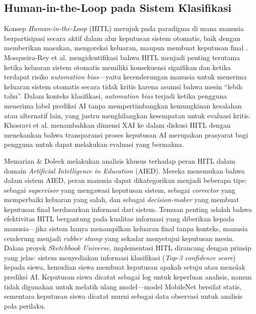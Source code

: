 \documentclass[12pt,a4paper,oneside,openany]{report}
\begin{document}
\subsection{Human-in-the-Loop pada Sistem Klasifikasi}
\label{subsec:hitl-klasifikasi}

Konsep \textit{Human-in-the-Loop} (HITL) merujuk pada paradigma di mana manusia berpartisipasi secara aktif dalam alur keputusan sistem otomatis, baik dengan memberikan masukan, mengoreksi keluaran, maupun membuat keputusan final \cite{ref4}. Mosqueira-Rey et al. \cite{ref4} mengidentifikasi bahwa HITL menjadi penting terutama ketika keluaran sistem otomatis memiliki konsekuensi signifikan dan ketika terdapat risiko \textit{automation bias}---yaitu kecenderungan manusia untuk menerima keluaran sistem otomatis secara tidak kritis karena asumsi bahwa mesin ``lebih tahu''. Dalam konteks klasifikasi, \textit{automation bias} terjadi ketika pengguna menerima label prediksi AI tanpa mempertimbangkan kemungkinan kesalahan atau alternatif lain, yang justru menghilangkan kesempatan untuk evaluasi kritis. Khosravi et al. \cite{ref3} menambahkan dimensi XAI ke dalam diskusi HITL dengan menekankan bahwa transparansi proses keputusan AI merupakan prasyarat bagi pengguna untuk dapat melakukan evaluasi yang bermakna.

Memarian \& Doleck \cite{ref5} melakukan analisis khusus terhadap peran HITL dalam domain \textit{Artificial Intelligence in Education} (AIED). Mereka menemukan bahwa dalam sistem AIED, peran manusia dapat dikategorikan menjadi beberapa tipe: sebagai \textit{supervisor} yang mengawasi keputusan sistem, sebagai \textit{corrector} yang memperbaiki keluaran yang salah, dan sebagai \textit{decision-maker} yang membuat keputusan final berdasarkan informasi dari sistem. Temuan penting adalah bahwa efektivitas HITL bergantung pada kualitas informasi yang diberikan kepada manusia---jika sistem hanya menampilkan keluaran final tanpa konteks, manusia cenderung menjadi \textit{rubber stamp} yang sekadar menyetujui keputusan mesin. Dalam proyek \textit{Sketchbook Universe}, implementasi HITL dirancang dengan prinsip yang jelas: sistem menyediakan informasi klasifikasi (\textit{Top-3 confidence score}) kepada siswa, kemudian siswa membuat keputusan apakah setuju atau menolak prediksi AI. Keputusan siswa dicatat sebagai log untuk keperluan analisis, namun tidak digunakan untuk melatih ulang model---model MobileNet bersifat statis, sementara keputusan siswa dicatat murni sebagai data observasi untuk analisis pola perilaku.
\end{document}
